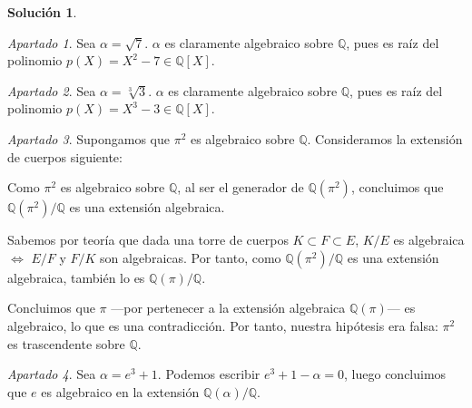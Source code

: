 \documentclass[a4paper, 11pt]{article}
\theoremstyle{definition}
\newtheorem*{solucion}{Solución}
\theoremstyle{remark}
\newtheorem{apartado}{Apartado}[ejercicio]
\begin{document}
  \begin{solucion}
      \begin{apartado}
          Sea $\alpha = \sqrt{7}$. $\alpha$ es claramente algebraico sobre $\mathbb{Q}$, pues es raíz del polinomio $p(X) = X^2 - 7 \in \mathbb{Q}[X]$.
      \end{apartado}

      \begin{apartado}
          Sea $\alpha = \sqrt[3]{3}$. $\alpha$ es claramente algebraico sobre $\mathbb{Q}$, pues es raíz del polinomio $p(X) = X^3 - 3 \in \mathbb{Q}[X]$.
      \end{apartado}

      \begin{apartado}
          Supongamos que $\pi^2$ es algebraico sobre $\mathbb{Q}$. Consideramos la extensión de cuerpos siguiente:

          \begin{figure}[h]
              \centering
          \end{figure}

          Como $\pi^2$ es algebraico sobre $\mathbb{Q}$, al ser el generador de $\mathbb{Q}(\pi^2)$, concluimos que $\mathbb{Q}(\pi^2)/\mathbb{Q}$ es una extensión algebraica.

          Sabemos por teoría que dada una torre de cuerpos $K \subset F \subset E$, $K/E$ es algebraica $\iff$ $E/F$ y $F/K$ son algebraicas. Por tanto, como  $\mathbb{Q}(\pi^2)/\mathbb{Q}$ es una extensión algebraica, también lo es $\mathbb{Q}(\pi)/\mathbb{Q}$.

          Concluimos que $\pi$ ---por pertenecer a la extensión algebraica $\mathbb{Q}(\pi)$--- es algebraico, lo que es una contradicción. Por tanto, nuestra hipótesis era falsa: $\pi^2$ es trascendente sobre $\mathbb{Q}$.
      \end{apartado}

      \begin{apartado}
          Sea $\alpha = e^3+1$. Podemos escribir $e^3 + 1 - \alpha = 0$, luego concluimos que $e$ es algebraico en la extensión $\mathbb{Q}(\alpha)/\mathbb{Q}$.


\end{apartado}
\end{solucion}
\end{document}
